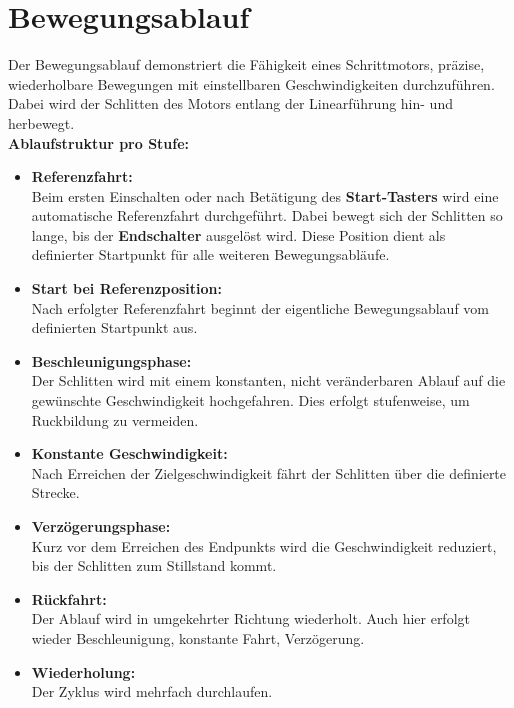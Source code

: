 \documentclass[a4paper,12pt]{report}
\begin{document}
\section{Bewegungsablauf}

\setlength{\leftskip}{1.5em}

Der Bewegungsablauf demonstriert die Fähigkeit eines Schrittmotors, präzise, wiederholbare Bewegungen mit einstellbaren Geschwindigkeiten durchzuführen. Dabei wird der Schlitten des Motors entlang der Linearführung hin- und herbewegt.  \\[0.75cm]

\noindent\textbf{Ablaufstruktur pro Stufe:}

\begin{itemize}[leftmargin=1.5em, itemsep=1em, topsep=0.5em]
	\item \textbf{Referenzfahrt:} \\
	Beim ersten Einschalten oder nach Betätigung des \textbf{Start-Tasters} wird eine automatische Referenzfahrt durchgeführt. Dabei bewegt sich der Schlitten so lange, bis der \textbf{Endschalter} ausgelöst wird. Diese Position dient als definierter Startpunkt für alle weiteren Bewegungsabläufe.
	
	\item \textbf{Start bei Referenzposition:} \\
	Nach erfolgter Referenzfahrt beginnt der eigentliche Bewegungsablauf vom definierten Startpunkt aus.
	
	\item \textbf{Beschleunigungsphase:} \\
	Der Schlitten wird mit einem konstanten, nicht veränderbaren Ablauf auf die gewünschte Geschwindigkeit hochgefahren. Dies erfolgt stufenweise, um Ruckbildung zu vermeiden.
	
	\item \textbf{Konstante Geschwindigkeit:} \\
	Nach Erreichen der Zielgeschwindigkeit fährt der Schlitten über die definierte Strecke.
	
	\item \textbf{Verzögerungsphase:} \\
	Kurz vor dem Erreichen des Endpunkts wird die Geschwindigkeit reduziert, bis der Schlitten zum Stillstand kommt.
	
	\item \textbf{Rückfahrt:} \\
	Der Ablauf wird in umgekehrter Richtung wiederholt. Auch hier erfolgt wieder Beschleunigung, konstante Fahrt, Verzögerung.
	
	\item \textbf{Wiederholung:} \\
	Der Zyklus wird mehrfach durchlaufen.
\end{itemize}
\end{document}

